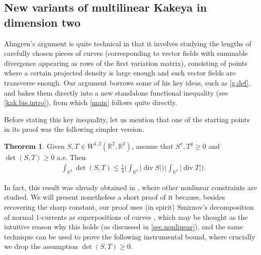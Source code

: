 \documentclass[11pt,a4paper]{amsart}
\newcommand{\R}{\mathbb{R}}
\theoremstyle{definition}
\newtheorem{thm}[definition]{Theorem}
\DeclareMathOperator{\dive}{div}
\begin{document}
\subsection{New variants of multilinear Kakeya in dimension two}
Almgren's argument is quite technical in that it
involves studying the lengths of carefully chosen pieces of curves (corresponding to vector fields
with summable divergence appearing as rows of the first variation matrix),
consisting of points where a certain projected density is large enough
and such vector fields are transverse enough.
Our argument borrows some of his key ideas, such as \cref{g.def}, and bakes them
directly into a new standalone functional inequality (see \cref{kak.bis.intro}), from which \cref{main} follows quite directly.

Before stating this key inequality, let us mention that one of the starting points
in its proof was the following simpler version.

\begin{thm}\label{det.simple.intro}
    Given $S,T\in W^{1,2}(\R^2,\R^2)$, assume that $S^x,T^y\ge 0$ and $\det(S,T)\ge 0$ a.e. Then
	\begin{align*}
		&\int_{\R^2}\det(S,T)\le\frac{1}{4}\Big(\int_{\R^2}\lvert \dive S\rvert \Big)\Big(\int_{\R^2}\lvert \dive T\rvert\Big).
    \end{align*}
\end{thm}

In fact, this result was already obtained in \cite{GRS}, where other nonlinear constraints are studied.
We will present nonetheless a short proof of it because, besides recovering the sharp constant,
our proof uses (in spirit) Smirnov's decomposition of normal $1$-currents as superpositions of curves \cite{Smirnov}, which may be thought as the intuitive reason why this holds (as discussed in \cref{sec.nonlinear}), and the same technique can be used to prove the following instrumental bound,
where crucially we drop the assumption $\det(S,T)\ge0$.
\end{document}
